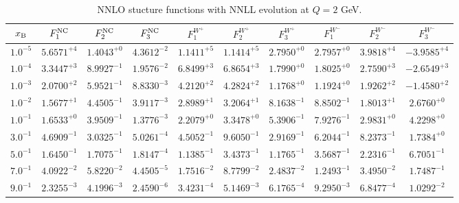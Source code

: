 \begin{table}[h]
\begin{adjustbox}{width=\textwidth}
\begin{tabular}{|c||c|c|c|c|c|c|c|c|c|}
\hline
$x_{\rm B}$ & $F_1^{\rm NC}$ & $F_2^{\rm NC}$ & $F_3^{\rm NC}$ & $F_1^{W^+}$ & $F_2^{W^+}$ & $F_3^{W^+}$ & $F_1^{W^-}$ & $F_2^{W^-}$ & $F_3^{W^-}$ \\
\hline
$ 1.0^{-5}$ & $ 5.6571^{+4}$ & $ 1.4043^{+0}$ & $ 4.3612^{-2}$ & $ 1.1411^{+5}$ & $ 1.1414^{+5}$ & $ 2.7950^{+0}$ & $ 2.7957^{+0}$ & $ 3.9818^{+4}$ & $-3.9585^{+4}$ \\
$ 1.0^{-4}$ & $ 3.3447^{+3}$ & $ 8.9927^{-1}$ & $ 1.9576^{-2}$ & $ 6.8499^{+3}$ & $ 6.8654^{+3}$ & $ 1.7990^{+0}$ & $ 1.8025^{+0}$ & $ 2.7590^{+3}$ & $-2.6549^{+3}$ \\
$ 1.0^{-3}$ & $ 2.0700^{+2}$ & $ 5.9521^{-1}$ & $ 8.8330^{-3}$ & $ 4.2120^{+2}$ & $ 4.2824^{+2}$ & $ 1.1768^{+0}$ & $ 1.1924^{+0}$ & $ 1.9262^{+2}$ & $-1.4580^{+2}$ \\
$ 1.0^{-2}$ & $ 1.5677^{+1}$ & $ 4.4505^{-1}$ & $ 3.9117^{-3}$ & $ 2.8989^{+1}$ & $ 3.2064^{+1}$ & $ 8.1638^{-1}$ & $ 8.8502^{-1}$ & $ 1.8013^{+1}$ & $ 2.6760^{+0}$ \\
$ 1.0^{-1}$ & $ 1.6533^{+0}$ & $ 3.9509^{-1}$ & $ 1.3776^{-3}$ & $ 2.2079^{+0}$ & $ 3.3478^{+0}$ & $ 5.3906^{-1}$ & $ 7.9276^{-1}$ & $ 2.9831^{+0}$ & $ 4.2298^{+0}$ \\
$ 3.0^{-1}$ & $ 4.6909^{-1}$ & $ 3.0325^{-1}$ & $ 5.0261^{-4}$ & $ 4.5052^{-1}$ & $ 9.6050^{-1}$ & $ 2.9169^{-1}$ & $ 6.2044^{-1}$ & $ 8.2373^{-1}$ & $ 1.7384^{+0}$ \\
$ 5.0^{-1}$ & $ 1.6450^{-1}$ & $ 1.7075^{-1}$ & $ 1.8147^{-4}$ & $ 1.1385^{-1}$ & $ 3.4373^{-1}$ & $ 1.1765^{-1}$ & $ 3.5687^{-1}$ & $ 2.2316^{-1}$ & $ 6.7051^{-1}$ \\
$ 7.0^{-1}$ & $ 4.0922^{-2}$ & $ 5.8220^{-2}$ & $ 4.4505^{-5}$ & $ 1.7516^{-2}$ & $ 8.7799^{-2}$ & $ 2.4837^{-2}$ & $ 1.2493^{-1}$ & $ 3.4950^{-2}$ & $ 1.7487^{-1}$ \\
$ 9.0^{-1}$ & $ 2.3255^{-3}$ & $ 4.1996^{-3}$ & $ 2.4590^{-6}$ & $ 3.4231^{-4}$ & $ 5.1469^{-3}$ & $ 6.1765^{-4}$ & $ 9.2950^{-3}$ & $ 6.8477^{-4}$ & $ 1.0292^{-2}$ \\
\hline
\end{tabular}
\end{adjustbox}\caption{NNLO stucture functions with NNLL evolution at $Q = 2$ GeV.}
\label{tab:N2LO-Q2}
\end{table}


